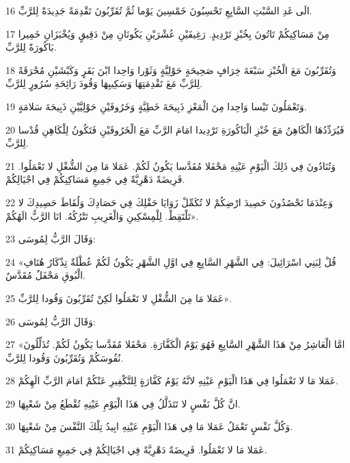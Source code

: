 \par 16 الَى غَدِ السَّبْتِ السَّابِعِ تَحْسِبُونَ خَمْسِينَ يَوْما ثُمَّ تُقَرِّبُونَ تَقْدِمَةً جَدِيدَةً لِلرَّبِّ.
\par 17 مِنْ مَسَاكِنِكُمْ تَاتُونَ بِخُبْزِ تَرْدِيدٍ. رَغِيفَيْنِ عُشْرَيْنِ يَكُونَانِ مِنْ دَقِيقٍ وَيُخْبَزَانِ خَمِيرا بَاكُورَةً لِلرَّبِّ.
\par 18 وَتُقَرِّبُونَ مَعَ الْخُبْزِ سَبْعَةَ خِرَافٍ صَحِيحَةٍ حَوْلِيَّةٍ وَثَوْرا وَاحِدا ابْنَ بَقَرٍ وَكَبْشَيْنِ مُحْرَقَةً لِلرَّبِّ مَعَ تَقْدِمَتِهَا وَسَكِيبِهَا وَقُودَ رَائِحَةِ سُرُورٍ لِلرَّبِّ.
\par 19 وَتَعْمَلُونَ تَيْسا وَاحِدا مِنَ الْمَعْزِ ذَبِيحَةَ خَطِيَّةٍ وَخَرُوفَيْنِ حَوْلِيَّيْنِ ذَبِيحَةَ سَلامَةٍ.
\par 20 فَيُرَدِّدُهَا الْكَاهِنُ مَعَ خُبْزِ الْبَاكُورَةِ تَرْدِيدا امَامَ الرَّبِّ مَعَ الْخَرُوفَيْنِ فَتَكُونُ لِلْكَاهِنِ قُدْسا لِلرَّبِّ.
\par 21 وَتُنَادُونَ فِي ذَلِكَ الْيَوْمِ عَيْنِهِ مَحْفَلا مُقَدَّسا يَكُونُ لَكُمْ. عَمَلا مَا مِنَ الشُّغْلِ لا تَعْمَلُوا. فَرِيضَةً دَهْرِيَّةً فِي جَمِيعِ مَسَاكِنِكُمْ فِي اجْيَالِكُمْ.
\par 22 وَعِنْدَمَا تَحْصُدُونَ حَصِيدَ ارْضِكُمْ لا تُكَمِّلْ زَوَايَا حَقْلِكَ فِي حَصَادِكَ وَلُقَاطَ حَصِيدِكَ لا تَلْتَقِطْ. لِلْمِسْكِينِ وَالْغَرِيبِ تَتْرُكُهُ. انَا الرَّبُّ الَهُكُمْ».
\par 23 وَقَالَ الرَّبُّ لِمُوسَى:
\par 24 «قُلْ لِبَنِي اسْرَائِيلَ: فِي الشَّهْرِ السَّابِعِ فِي اوَّلِ الشَّهْرِ يَكُونُ لَكُمْ عُطْلَةٌ تِذْكَارُ هُتَافِ الْبُوقِ مَحْفَلٌ مُقَدَّسٌ.
\par 25 عَمَلا مَا مِنَ الشُّغْلِ لا تَعْمَلُوا لَكِنْ تُقَرِّبُونَ وَقُودا لِلرَّبِّ».
\par 26 وَقَالَ الرَّبُّ لِمُوسَى:
\par 27 «امَّا الْعَاشِرُ مِنْ هَذَا الشَّهْرِ السَّابِعِ فَهُوَ يَوْمُ الْكَفَّارَةِ. مَحْفَلا مُقَدَّسا يَكُونُ لَكُمْ. تُذَلِّلُونَ نُفُوسَكُمْ وَتُقَرِّبُونَ وَقُودا لِلرَّبِّ.
\par 28 عَمَلا مَا لا تَعْمَلُوا فِي هَذَا الْيَوْمِ عَيْنِهِ لانَّهُ يَوْمُ كَفَّارَةٍ لِلتَّكْفِيرِ عَنْكُمْ امَامَ الرَّبِّ الَهِكُمْ.
\par 29 انَّ كُلَّ نَفْسٍ لا تَتَذَلَّلُ فِي هَذَا الْيَوْمِ عَيْنِهِ تُقْطَعُ مِنْ شَعْبِهَا.
\par 30 وَكُلَّ نَفْسٍ تَعْمَلُ عَمَلا مَا فِي هَذَا الْيَوْمِ عَيْنِهِ ابِيدُ تِلْكَ النَّفْسَ مِنْ شَعْبِهَا.
\par 31 عَمَلا مَا لا تَعْمَلُوا. فَرِيضَةً دَهْرِيَّةً فِي اجْيَالِكُمْ فِي جَمِيعِ مَسَاكِنِكُمْ.
